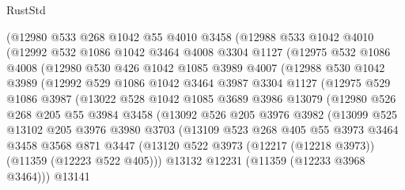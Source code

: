\begin{lexlean}{RustStd}
\begin{coremodule}
{{{{{{{{{{{{{{{{{{{      (@12980
        @533
        @268
        @1042
        @55
        @4010
        @3458
        (@12988
          @533
          @1042
          @4010
          (@12992
            @532
            @1086
            @1042
            @3464
            @4008
            @3304
            @1127
            (@12975
              @532
              @1086
              @4008
              (@12980
                @530
                @426
                @1042
                @1085
                @3989
                @4007
                (@12988
                  @530
                  @1042
                  @3989
                  (@12992
                    @529
                    @1086
                    @1042
                    @3464
                    @3987
                    @3304
                    @1127
                    (@12975
                      @529
                      @1086
                      @3987
                      (@13022
                        @528
                        @1042
                        @1085
                        @3689
                        @3986
                        @13079
                        (@12980
                          @526
                          @268
                          @205
                          @55
                          @3984
                          @3458
                          (@13092
                            @526
                            @205
                            @3976
                            @3982
                            (@13099
                              @525
                              @13102
                              @205
                              @3976
                              @3980
                              @3703
                              (@13109
                                @523
                                @268
                                @405
                                @55
                                @3973
                                @3464
                                @3458
                                @3568
                                @871
                                @3447
                                (@13120
                                  @522
                                  @3973
                                  (@12217 (@12218 @3973))
                                  (@11359 (@12223 @522 @405)))
                                @13132
                                @12231
                                (@11359 (@12233 @3968 @3464)))
                              @13141
}}}}}}}}}}}}}}}}}}}
\end{coremodule}
\end{lexlean}

